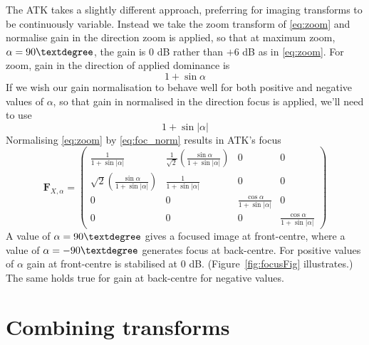 \documentclass[12pt]{article}
\providecommand{\abs}[1]{\lvert#1\rvert}
\begin{document}
The ATK takes a slightly different approach, preferring for imaging transforms to be continuously variable. Instead we take the zoom transform of \eqref{eq:zoom} and normalise gain in the direction zoom is applied, so that at maximum zoom, \(\alpha =  90\textdegree\), the gain is \(0\) dB rather than \(+6\) dB as in \eqref{eq:zoom}. For zoom, gain in the direction of applied dominance is \begin{equation}
	1 + \sin{\alpha}
\end{equation} If we wish our gain normalisation to behave well for both positive and negative values of \(\alpha\), so that gain in normalised in the direction focus is applied, we'll need to use \begin{equation}		\label{eq:foc_norm}
	1 + \sin{\abs{\alpha}}
\end{equation} Normalising \eqref{eq:zoom} by \eqref{eq:foc_norm} results in ATK's focus \begin{equation}
\mathbf{F}_{X, \alpha} = \begin{pmatrix}
	\frac{1}{1 + \sin{\abs{\alpha}}} & \frac{1}{\sqrt{2}}(\frac{\sin{\alpha}}{1 + \sin{\abs{\alpha}}}) & 0 & 0\\
	\sqrt{2}(\frac{\sin{\alpha}}{1 + \sin{\abs{\alpha}}}) & \frac{1}{1 + \sin{\abs{\alpha}}} & 0 & 0\\
	0 & 0 & \frac{\cos{\alpha}}{1 + \sin{\abs{\alpha}}} & 0\\
	0 & 0 & 0 & \frac{\cos{\alpha}}{1 + \sin{\abs{\alpha}}}
\end{pmatrix}
\end{equation} A value of \(\alpha = 90\textdegree\) gives a focused image at front-centre, where a value of \(\alpha = -90\textdegree\) generates focus at back-centre. For positive values of \(\alpha\) gain at front-centre is stabilised at \(0\) dB. (Figure~\ref{fig:focusFig} illustrates.) The same holds true for gain at back-centre for negative values.


\section{Combining transforms}
\end{document}

